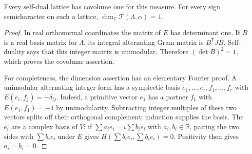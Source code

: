 \begin{lemma}\label{tc-covolume}
Every self-dual lattice has covolume one for this measure.
For every sign semicharacter on such a lattice,
$\dim_{\mathbb C}\mathcal T(\Lambda,\alpha)=1$.
\end{lemma}
\begin{proof}
In real orthonormal coordinates the matrix of $E$ has determinant
one.  If $B$ is a real basis matrix for $\Lambda$, its integral
alternating Gram matrix is $B^{\mathsf T}JB$.
Self-duality says that this integer matrix is unimodular.
Therefore $(\det B)^2=1$, which proves the covolume assertion.

For completeness, the dimension assertion has an elementary
Fourier proof.  A unimodular alternating integer form has a
symplectic basis $e_1,\ldots,e_r,f_1,\ldots,f_r$ with
$E(e_i,f_j)=-\delta_{ij}$.
Indeed, a primitive vector $e_1$ has a partner $f_1$ with
$E(e_1,f_1)=-1$ by unimodularity.  Subtracting integer multiples
of these two vectors splits off their orthogonal complement;
induction supplies the basis.
The $e_i$ are a complex basis of $V$: if
$\sum a_i e_i=i\sum b_i e_i$ with $a_i,b_i\in\mathbb R$,
pairing the two sides with $\sum b_i e_i$ under $E$ gives
$H(\sum b_i e_i,\sum b_i e_i)=0$.  Positivity then gives
$a_i=b_i=0$.


\end{proof}

